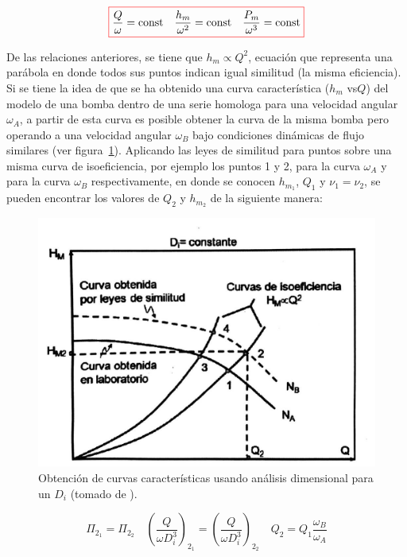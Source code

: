 \documentclass[11pt, oneside]{article}
\begin{document}
\begin{equation}
\color{red}\boxed{\color{black} \frac{Q}{\omega} = \text{const} \quad \frac{h_m}{\omega^2}= \text{const}  \quad \frac{P_m}{\omega^3}= \text{const} }
\label{boma7}
\end{equation}

De las relaciones anteriores, se tiene que $h_m \propto Q^2$, ecuaci\'on que representa una par\'abola en donde todos sus puntos indican igual similitud (la misma eficiencia). Si se tiene la idea de que se ha obtenido una curva caracter\'istica ($h_m$ vs$Q$) del modelo de una bomba dentro de una serie homologa para una velocidad angular $\omega_A$, a partir de esta curva es posible obtener la curva de la misma bomba pero operando a una velocidad angular $\omega_B$ bajo condiciones din\'amicas de flujo similares (ver figura~\ref{bom8}). Aplicando las leyes de similitud para puntos sobre una misma curva de isoeficiencia, por ejemplo los puntos 1 y 2, para la curva $\omega_A$ y para la curva $\omega_B$ respectivamente, en donde se conocen $h_{m_1}$, $Q_1$ y $\nu_1 = \nu_2$, se pueden encontrar los valores de $Q_2$ y $h_{m_2}$ de la siguiente manera:

\begin{figure}[h]
\centering
\includegraphics[width=12cm]{./figs/bom8.jpeg}
\caption{Obtenci\'on de curvas caracter\'isticas usando an\'alisis dimensional para un $D_i$ (tomado de \cite{agudelo2011mecanica}).} 
\label{bom8}
\end{figure}


\begin{equation}
\Pi_{2_1} = \Pi_{2_2} \quad \left( \frac{Q}{\omega D_i^3} \right)_{2_1} = \left( \frac{Q}{\omega D_i^3} \right)_{2_2} \quad Q_2 = Q_1 \frac{\omega_B}{\omega_A}
\label{boma8}
\end{equation}
\end{document}
